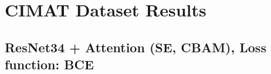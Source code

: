 \documentclass{article}
\begin{document}
\section{CIMAT Dataset Results}
\subsection{ResNet34 + Attention (SE, CBAM), Loss function: BCE}

\end{document}
